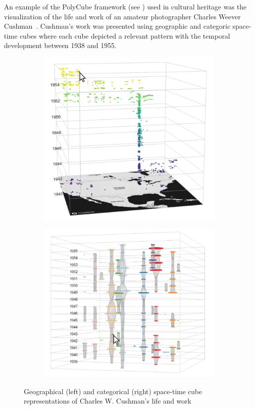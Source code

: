 An example of the PolyCube framework (see ) used in cultural heritage was the visualization
of the life and work of an amateur photographer Charles Weever Cushman~\citep{mayr2019visualizing}. Cushman’s work was presented using
geographic and categoric space-time cubes where each cube depicted a relevant pattern with the temporal development between 1938 and 1955.

\begin{figure}[hbt!]
    \centering
    \begin{subfigure}{.5\textwidth}
        \centering
        \includegraphics[width=0.9\linewidth]{graphics/2-literature-review/artist1}
    \end{subfigure}%
    \begin{subfigure}{.5\textwidth}
        \centering
        \includegraphics[width=\linewidth]{graphics/2-literature-review/artist2}
    \end{subfigure}
    \caption{Geographical (left) and categorical (right) space-time cube representations of Charles W. Cushman's life and  work}
    \label{fig:figure2.artist}
\end{figure}


